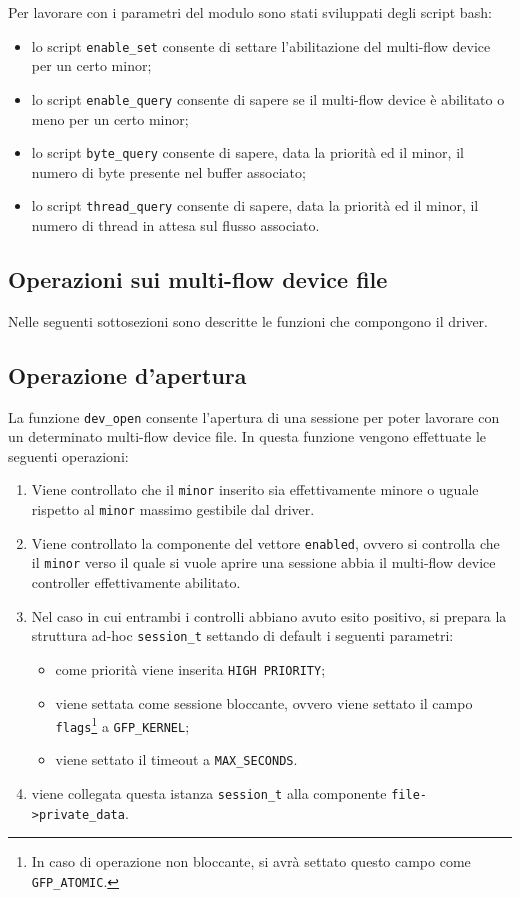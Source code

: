 \documentclass[oneside]{article}
\begin{document}
Per lavorare con i parametri del modulo sono stati sviluppati degli script bash:
\begin{itemize}
\item lo script \texttt{enable\_set} consente di settare l'abilitazione del multi-flow device per un certo minor;
\item lo script \texttt{enable\_query} consente di sapere se il multi-flow device è abilitato o meno per un certo minor;
\item lo script \texttt{byte\_query} consente di sapere, data la priorità ed il minor, il numero di byte presente nel buffer associato;
\item lo script \texttt{thread\_query} consente di sapere, data la priorità ed il minor, il numero di thread in attesa sul flusso associato.
\end{itemize}
\subsection{Operazioni sui multi-flow device file}
Nelle seguenti sottosezioni sono descritte le funzioni che compongono il driver.

\subsection{Operazione d'apertura}
La funzione \texttt{dev\_open} consente l'apertura di una sessione per poter lavorare con un determinato multi-flow device file. In questa funzione vengono effettuate le seguenti operazioni:
\begin{enumerate}
\item Viene controllato che il \texttt{minor} inserito sia effettivamente minore o uguale rispetto al \texttt{minor} massimo gestibile dal driver.
\item Viene controllato la componente del vettore \texttt{enabled}, ovvero si controlla che il \texttt{minor} verso il quale si vuole aprire una sessione abbia il multi-flow device controller effettivamente abilitato.
\item Nel caso in cui entrambi i controlli abbiano avuto esito positivo, si prepara la struttura ad-hoc \texttt{session\_t} settando di default i seguenti parametri:
\begin{itemize}
\item come priorità viene inserita \texttt{HIGH PRIORITY};
\item viene settata come sessione bloccante, ovvero viene settato il campo \texttt{flags}\footnote{In caso di operazione non bloccante, si avrà settato questo campo come \texttt{GFP\_ATOMIC}.} a \texttt{GFP\_KERNEL};
\item viene settato il timeout a \texttt{MAX\_SECONDS}.
\end{itemize}
\item viene collegata questa istanza \texttt{session\_t} alla componente \texttt{file->private\_data}.
\end{enumerate}
\end{document}
